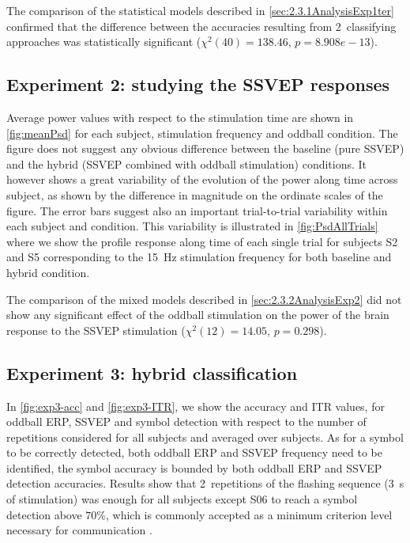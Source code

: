 \documentclass[10pt]{article}
\begin{document}
    The comparison of the statistical models described in \autoref{sec:2.3.1AnalysisExp1ter} confirmed that the difference between the accuracies resulting from 2~classifying approaches was statistically significant ($\chi^2(40)=138.46$, $p=8.908e-13$).



    \subsection{Experiment 2: studying the \acs{SSVEP} responses}
    \label{sec:3.2SSVEP}
    Average power values with respect to the stimulation time are shown in \autoref{fig:meanPsd} for each subject, stimulation frequency and oddball condition.
    The figure does not suggest any obvious difference between the baseline (pure SSVEP) and the hybrid (SSVEP combined with oddball stimulation) conditions.
    It however shows a great variability of the evolution of the power along time across subject, as shown by the difference in magnitude on the ordinate scales of the figure.
    The error bars suggest also an important trial-to-trial variability within each subject and condition.
    This variability is illustrated in \autoref{fig:PsdAllTrials} where we show the profile response along time of each single trial for subjects S2 and S5 corresponding to the \SI{15}{\Hz} stimulation frequency for both baseline and hybrid condition.

    The comparison of the mixed models described in \autoref{sec:2.3.2AnalysisExp2} did not show any significant effect of the oddball stimulation on the power of the brain response to the SSVEP stimulation ($\chi^2(12)=14.05$, $p=0.298$).


    \subsection{Experiment 3: hybrid classification}
    \label{sec:3.3Hybrid}
    In \autoref{fig:exp3-acc} and \autoref{fig:exp3-ITR}, we show the accuracy and ITR values, for oddball ERP, SSVEP and symbol detection with respect to the number of repetitions considered for all subjects and averaged over subjects.
    As for a symbol to be correctly detected, both oddball ERP and SSVEP frequency need to be identified, the symbol accuracy is bounded by both oddball ERP and SSVEP detection accuracies.
    Results show that 2~repetitions of the flashing sequence (\SI{3}{\s} of stimulation) was enough for all subjects except S06 to reach a symbol detection above $70\%$, which is commonly accepted as a minimum criterion level necessary for communication \parencite{Kubler2008, Kubler2004, Brunner2011, Combaz2013}.
\end{document}
